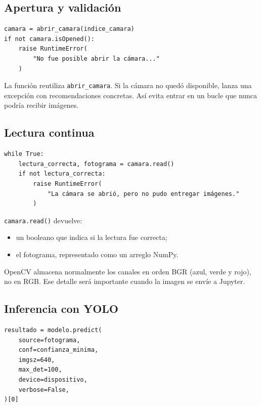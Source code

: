 \documentclass[11pt,a4paper]{article}
\begin{document}
\subsection{Apertura y validación}

\begin{lstlisting}
camara = abrir_camara(indice_camara)
if not camara.isOpened():
    raise RuntimeError(
        "No fue posible abrir la cámara..."
    )
\end{lstlisting}

La función reutiliza \texttt{abrir\_camara}. Si la cámara no quedó disponible,
lanza una excepción con recomendaciones concretas. Así evita entrar en un
bucle que nunca podría recibir imágenes.

\subsection{Lectura continua}

\begin{lstlisting}
while True:
    lectura_correcta, fotograma = camara.read()
    if not lectura_correcta:
        raise RuntimeError(
            "La cámara se abrió, pero no pudo entregar imágenes."
        )
\end{lstlisting}

\texttt{camara.read()} devuelve:

\begin{itemize}
  \item un booleano que indica si la lectura fue correcta;
  \item el fotograma, representado como un arreglo NumPy.
\end{itemize}

OpenCV almacena normalmente los canales en orden BGR
(azul, verde y rojo), no en RGB. Ese detalle será importante cuando la imagen
se envíe a Jupyter.

\subsection{Inferencia con YOLO}

\begin{lstlisting}
resultado = modelo.predict(
    source=fotograma,
    conf=confianza_minima,
    imgsz=640,
    max_det=100,
    device=dispositivo,
    verbose=False,
)[0]
\end{lstlisting}
\end{document}
